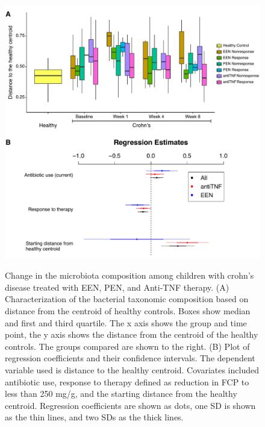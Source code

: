 \begin{figure}[p]
\centering
{\includegraphics[scale=0.6,trim=0 0 0 0,clip]{Figure/F24_Distance.pdf}}
\caption[Change in the microbiota composition among children with crohn's disease treated with EEN, PEN, and Anti-TNF therapy]{Change in the microbiota composition among children with crohn's disease treated with EEN, PEN, and Anti-TNF therapy.
(A) Characterization of the bacterial taxonomic composition based on distance from the centroid of healthy controls. Boxes show median and first and third quartile. The x axis shows the group and time point, the y axis shows the distance from the centroid of the healthy controls. The groups compared are shown to the right.
(B) Plot of regression coefficients and their confidence intervals. The dependent variable used is distance to the healthy centroid. Covariates included antibiotic use, response to therapy defined as reduction in FCP to less than 250 mg/g, and the starting distance from the healthy centroid. Regression coefficients are shown as dots, one SD is shown as the thin lines, and two SDs as the thick lines.
}
\label{F24_Distance}
\end{figure}




